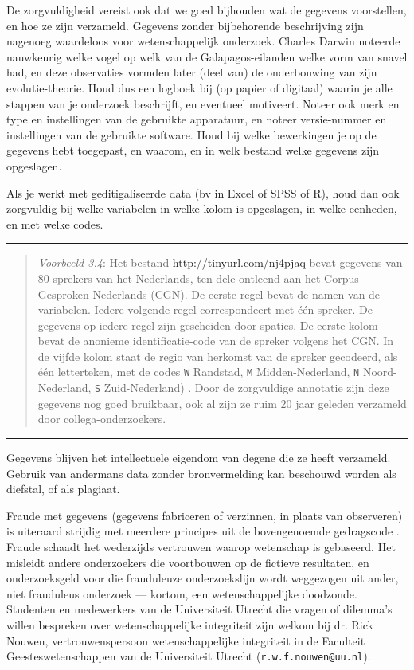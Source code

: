 \documentclass[
]{book}
\begin{document}
De zorgvuldigheid vereist ook dat we goed bijhouden wat de gegevens
voorstellen, en hoe ze zijn verzameld. Gegevens zonder bijbehorende
beschrijving zijn nagenoeg waardeloos voor wetenschappelijk onderzoek.
Charles Darwin noteerde nauwkeurig welke vogel op welk van de
Galapagos-eilanden welke vorm van snavel had, en deze observaties
vormden later (deel van) de onderbouwing van zijn evolutie-theorie. Houd
dus een logboek bij (op papier of digitaal) waarin je alle stappen van
je onderzoek beschrijft, en eventueel motiveert. Noteer ook merk en type
en instellingen van de gebruikte apparatuur, en noteer versie-nummer en
instellingen van de gebruikte software. Houd bij welke bewerkingen je op
de gegevens hebt toegepast, en waarom, en in welk bestand welke gegevens
zijn opgeslagen.

Als je werkt met geditigaliseerde data (bv in Excel of SPSS of R), houd
dan ook zorgvuldig bij welke variabelen in welke kolom is opgeslagen, in
welke eenheden, en met welke codes.

\begin{center}\rule{0.5\linewidth}{0.5pt}\end{center}

\begin{quote}
\emph{Voorbeeld 3.4}: Het
bestand \url{http://tinyurl.com/nj4pjaq} bevat gegevens van 80 sprekers van
het Nederlands, ten dele ontleend aan het Corpus Gesproken Nederlands
(CGN). De eerste regel bevat de namen van de variabelen. Iedere volgende
regel correspondeert met één spreker. De gegevens op iedere regel zijn
gescheiden door spaties. De eerste kolom bevat de anonieme
identificatie-code van de spreker volgens het CGN. In de vijfde kolom
staat de regio van herkomst van de spreker gecodeerd, als één
letterteken, met de codes \texttt{W} Randstad, \texttt{M} Midden-Nederland, \texttt{N}
Noord-Nederland, \texttt{S} Zuid-Nederland) \citep{Quene08}. Door de zorgvuldige
annotatie zijn deze gegevens nog goed bruikbaar, ook al zijn ze ruim 20
jaar geleden verzameld door collega-onderzoekers.
\end{quote}

\begin{center}\rule{0.5\linewidth}{0.5pt}\end{center}

Gegevens blijven het intellectuele eigendom van degene die ze heeft
verzameld. Gebruik van andermans data zonder bronvermelding kan
beschouwd worden als diefstal, of als plagiaat.

Fraude met gegevens (gegevens fabriceren of verzinnen, in plaats van
observeren) is uiteraard strijdig met meerdere principes uit de
bovengenoemde gedragscode \citep{VSNU18}. Fraude schaadt het wederzijds
vertrouwen waarop wetenschap is gebaseerd. Het misleidt andere
onderzoekers die voortbouwen op de fictieve resultaten, en
onderzoeksgeld voor die frauduleuze onderzoekslijn wordt weggezogen uit
ander, niet frauduleus onderzoek --- kortom, een wetenschappelijke
doodzonde.
Studenten en medewerkers van de Universiteit Utrecht die vragen of dilemma's willen bespreken over wetenschappelijke integriteit zijn welkom bij dr. Rick Nouwen, vertrouwenspersoon wetenschappelijke integriteit in de Faculteit Geesteswetenschappen van de Universiteit Utrecht (\texttt{r.w.f.nouwen@uu.nl}).
\end{document}
